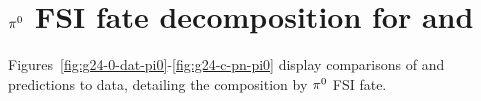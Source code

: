  

\section{$\pi^0$ FSI fate decomposition for \gZero and \gC}\label{sec:appfate}

Figures~\ref{fig:g24-0-dat-pi0}-\ref{fig:g24-c-pn-pi0} display comparisons of  \gZero and \gC predictions to data, detailing the composition by $\pi^0$ FSI fate.


